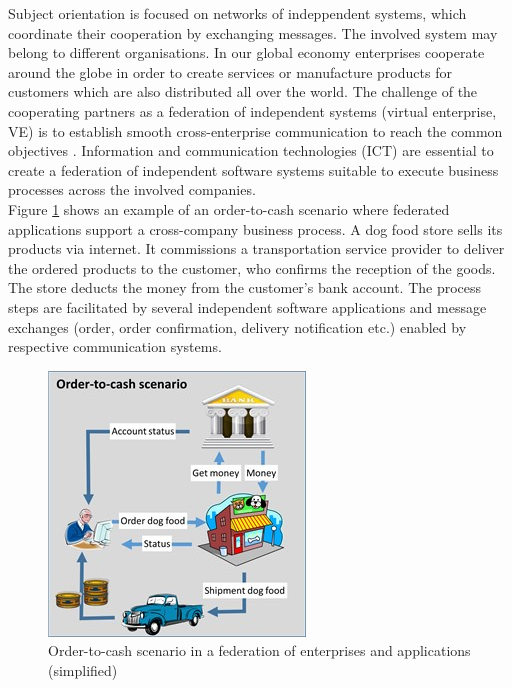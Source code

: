 Subject orientation is focused on networks of indeppendent systems, which coordinate their cooperation by exchanging messages. The involved system may belong to different organisations.
In our global economy enterprises cooperate around the globe in order to create services or manufacture products for customers which are also distributed all over the world. The challenge of the cooperating partners as a federation of independent systems (virtual enterprise, VE) is to establish smooth cross-enterprise communication to reach the common objectives \cite{article:VirtualEnterprise}. Information and communication technologies (ICT) are essential to create a federation of independent software systems suitable to execute business processes across the involved companies. 
\\
Figure \ref{fig:DogFoodShop} shows an example of an order-to-cash scenario where federated applications support a cross-company business process. A dog food store sells its products via internet. It commissions a transportation service provider to deliver the ordered products to the customer, who confirms the reception of the goods. The store deducts the money from the customer's bank account. The process steps are facilitated by several independent software applications and message exchanges (order, order confirmation, delivery notification etc.) enabled by respective communication systems.


\begin{figure}[htbp]
	\centering
	\includegraphics[width=0.6\linewidth] {Figures/Chapter5/Project/DogFoodShop.jpg}
	\caption[Order-to-cash scenario in a federation of enterprises and applications (simplified)]{Order-to-cash scenario in a federation of enterprises and applications (simplified)}
	\label{fig:DogFoodShop}
\end{figure}

